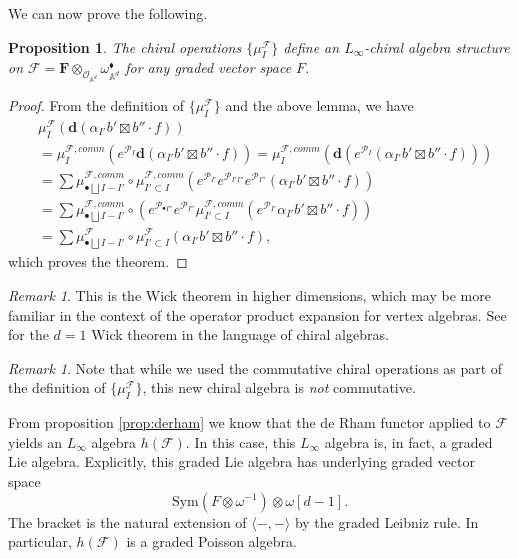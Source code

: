 \documentclass[11pt]{amsart}
\newtheorem{prop}[thm]{Proposition}
\theoremstyle{definition}
\theoremstyle{remark}
\newtheorem{rem}[thm]{Remark}
\numberwithin{equation}{section}
\begin{document}
We can now prove the following.

\begin{prop}
    The chiral operations $\{\mu^{\mathcal{F}}_{{I}}\}$ define an $L_{\infty}$-chiral algebra structure on $\mathcal{F}
    =\mathbf{F}\otimes_{\mathcal{O}_{\mathbb{A}^d}} \omega_{\mathbb{A}^d}^{\blacklozenge}$ for any graded vector space
    $F$.
\end{prop}
\begin{proof}
From the definition of  $\{\mu^{\mathcal{F}}_{{I}}\}$ and the above lemma, we have
\begin{align*}
&\mu^{\mathcal{F}}_{{I}}\left(\mathbf{d}(\alpha_{{I'}}b'\boxtimes b''\cdot f)\right)\\
&=\mu^{\mathcal{F},comm}_{{I}}\left(e^{{\mathcal{P}}_{{I}}}\mathbf{d}(\alpha_{{I'}}b'\boxtimes b''\cdot f)\right)
=\mu^{\mathcal{F},comm}_{{I}}\left(\mathbf{d}(e^{{\mathcal{P}}_{{I}}}(\alpha_{{I'}}b'\boxtimes b''\cdot f))\right)\\
&=\sum \mu^{\mathcal{F},comm}_{\bullet\bigsqcup {I}-{I'}}\circ \mu^{\mathcal{F},comm}_{{I'}\subset{I}}\left(e^{{\mathcal{P}}_{{I'}}}e^{{\mathcal{P}}_{{I'}{I''}}}e^{{\mathcal{P}}_{{I''}}}(\alpha_{{I'}}b'\boxtimes b''\cdot f) \right)\\
&=\sum \mu^{\mathcal{F},comm}_{\bullet\bigsqcup {I}-{I'}}\circ \left(e^{{\mathcal{P}}_{\bullet{I''}}}e^{{\mathcal{P}}
_{{I''}}} \mu^{\mathcal{F},comm}_{{I'}\subset {I}}(e^{{\mathcal{P}}_{{I'}}}\alpha_{{I'}}b'\boxtimes b''\cdot f)\right)\\
&=\sum \mu^{\mathcal{F}}_{\bullet\bigsqcup{I}-{I'}}\circ \mu^{\mathcal{F}}_{{I'}\subset {I}}\left(\alpha_{{I'}}b'\boxtimes b''\cdot f\right),
\end{align*}
which proves the theorem.
 \end{proof}
\begin{rem}
  This is the Wick theorem in higher dimensions, which may be more familiar in the context of the operator product
  expansion for vertex algebras.
  See \cite{gui2023,gui2022elliptictracemapchiral} for the $d=1$ Wick theorem in the language of chiral algebras.  
\end{rem}
\begin{rem}
  Note that while we used the commutative chiral operations as part of the definition of $\{\mu_I^{\mathcal{F}}\}$,
  this new chiral algebra is \textit{not} commutative.
\end{rem}

From proposition \ref{prop:derham} we know that the de Rham functor applied to $\mathcal{F}$ yields an $L_\infty$
algebra $h(\mathcal{F})$.
In this case, this $L_\infty$ algebra is, in fact, a graded Lie algebra.
Explicitly, this graded Lie algebra has underlying graded vector space
\begin{equation}\label{}
  \mathrm{Sym} \left(F \otimes \omega^{-1}\right) \otimes \omega [d-1] .
\end{equation}
The bracket is the natural extension of $\langle - , - \rangle$ by the graded Leibniz rule.
In particular, $h(\mathcal{F})$ is a graded Poisson algebra.
\end{document}
